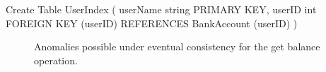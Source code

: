 \begin{codesql}
Create Table UserIndex (
  userName string PRIMARY KEY,
  userID int
  FOREIGN KEY (userID)
    REFERENCES BankAccount (userID) )
\end{codesql}

\begin{figure}[t]
\centering
{}
\hfill
{}
\hfill
{}
\caption{Anomalies possible under eventual consistency for the get balance operation.}
\label{fig:cleanliness_examples}
\end{figure}

